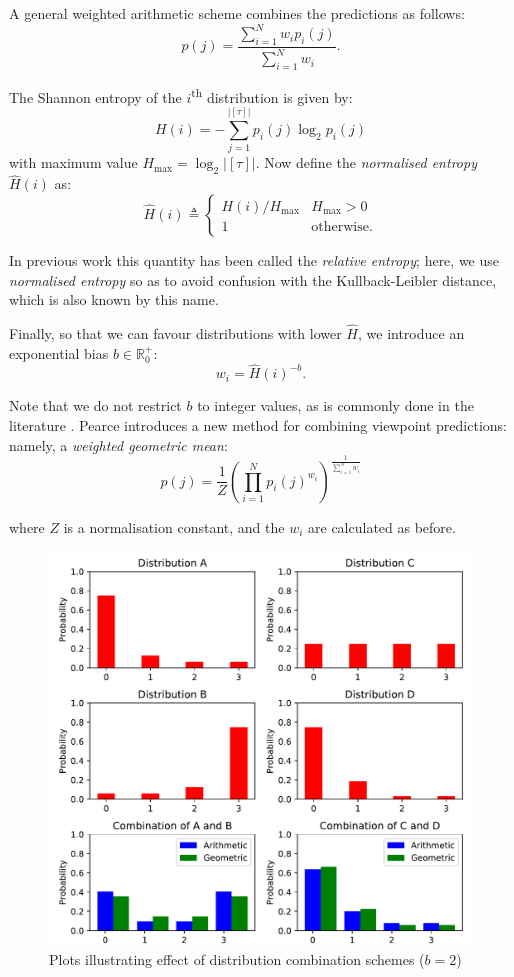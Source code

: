 \documentclass[12pt,a4paper,twoside,openright]{report}
\begin{document}
A general weighted arithmetic scheme combines the predictions as follows:
$$
  p(j) = \frac{ \sum_{i = 1}^N w_i p_i(j) }{ \sum_{i = 1}^N w_i }.
$$

The Shannon entropy of the $i$\textsuperscript{th} distribution is given by:
$$ H(i) = - \sum_{j = 1}^{|[\tau]|} p_i(j) \log_2 p_i(j) $$
with maximum value $H_{\mathrm{max}} = \log_2{ |[\tau]| }$. Now define the
\emph{normalised entropy} $\hat{H}(i)$ as:
$$ \hat{H}(i) \triangleq \begin{cases}
  H(i)/H_{\mathrm{max}} & H_{\mathrm{max}} > 0 \\
  1 & \text{otherwise.}
\end{cases} $$

In previous work this quantity has been called the \emph{relative entropy};
here, we use \emph{normalised entropy} so as to avoid confusion with the
Kullback-Leibler distance, which is also known by this name.

Finally, so that we can favour distributions with lower $\hat{H}$, we introduce
an exponential bias $b \in \mathbb{R}_0^+$:
$$ w_i = \hat{H}(i)^{-b}. $$

Note that we do not restrict $b$ to integer values, as is commonly done in the
literature \cite{whorley2013phd}. Pearce \cite{pearce2004improved} introduces a
new method for combining viewpoint predictions: namely, a \emph{weighted
geometric mean}:
$$ p(j) = \frac{1}{Z} \left( \prod_{i = 1}^N p_i(j)^{w_i} \right)^{ \frac{1}{
\sum_{i = 1}^N w_i }} $$

where $Z$ is a normalisation constant, and the $w_i$ are calculated as before.

\begin{figure}[H]
\centering
\includegraphics[width=400pt]{figs/dist_comb.pdf}
\caption{Plots illustrating effect of distribution combination schemes ($b = 2$)}
\label{fig:dist-comb-plot}
\end{figure}
\end{document}
